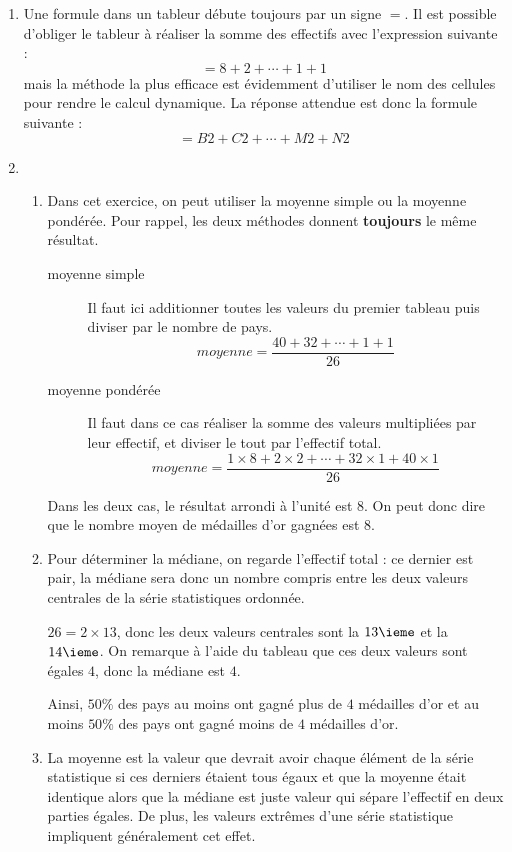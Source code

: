 \documentclass[12pt, french]{article}
\begin{document}
	\begin{enumerate}
		\item Une formule dans un tableur débute toujours par un signe $=$. Il est possible d'obliger le tableur à réaliser la somme des effectifs avec l'expression suivante :
		\[= 8 + 2 + \cdots + 1 + 1\]
		mais la méthode la plus efficace est évidemment d'utiliser le nom des cellules pour rendre le calcul dynamique. La réponse attendue est donc la formule suivante :
		\[=B2 + C2 + \cdots + M2 + N2\]
		
		\item \begin{enumerate}
			\item Dans cet exercice, on peut utiliser la moyenne simple ou la moyenne pondérée. Pour rappel, les deux méthodes donnent \textbf{toujours} le même résultat.
			\begin{description}
				\item[moyenne simple]
				
				Il faut ici additionner toutes les valeurs du premier tableau puis diviser par le nombre de pays.
				\[moyenne = \dfrac{40 + 32 + \cdots + 1 + 1}{26}\]
				\item[moyenne pondérée]
				
				Il faut dans ce cas réaliser la somme des valeurs multipliées par leur effectif, et diviser le tout par l'effectif total.
				\[moyenne = \dfrac{1\times 8 + 2\times 2 + \cdots + 32\times 1 + 40\times 1}{26}\]
			\end{description}
			Dans les deux cas, le résultat arrondi à l'unité est $8$. On peut donc dire que le nombre moyen de médailles d'or gagnées est $8$.
			\item Pour déterminer la médiane, on regarde l'effectif total : ce dernier est pair, la médiane sera donc un nombre compris entre les deux valeurs centrales de la série statistiques ordonnée.

			$26 = 2 \times 13$, donc les deux valeurs centrales sont la $13\ieme$ et la $14\ieme$. On remarque à l'aide du tableau que ces deux valeurs sont égales $4$, donc la médiane est $4$.
			
			Ainsi, $50\%$ des pays au moins ont gagné plus de $4$ médailles d'or et au moins $50\%$ des pays ont gagné moins de $4$ médailles d'or.
			
			\item La moyenne est la valeur que devrait avoir chaque élément de la série statistique si ces derniers étaient tous égaux et que la moyenne était identique alors que la médiane est juste valeur qui sépare l'effectif en deux parties égales. De plus, les valeurs extrêmes d'une série statistique impliquent généralement cet effet.
		\end{enumerate}
	

\end{enumerate}
\end{document}
